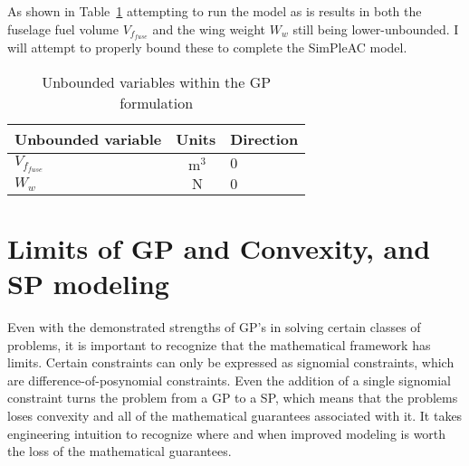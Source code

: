 
As shown in Table~\ref{t:WLTD_unbounded} attempting to run the model as is
results in both the fuselage fuel
volume $V_{f_{fuse}}$ and the wing weight $W_w$ still being lower-unbounded.
I will attempt to properly bound these to complete the SimPleAC model.

\begin{footnotesize}
    \begin{center}
        \begin{table}
            \begin{tabular}{ l c l }
                \toprule
                Unbounded variable & Units & Direction \\
                \midrule
                $V_{f_{fuse}}$ &  $~\mathrm{m^3}$  & $0$ \\
                $W_w$ & $~\mathrm{N}$  & $0$ \\
                \bottomrule
            \end{tabular}
            \caption{Unbounded variables within the GP formulation}
            \label{t:WLTD_unbounded}
        \end{table}
    \end{center}
\end{footnotesize}

\section{Limits of GP and Convexity, and SP modeling} \label{s:GPLimits}

Even with the demonstrated strengths of \gls{GP}'s in solving certain classes of 
problems, it is important to recognize that the mathematical framework has limits. 
Certain constraints can only be expressed as signomial constraints, which are 
difference-of-posynomial constraints. Even the addition of a single
signomial constraint turns the problem from a \gls{GP} to a \gls{SP}, which means
that the problems loses convexity and all of the mathematical guarantees associated with it. 
It takes engineering intuition to recognize where and when improved modeling is worth
the loss of the mathematical guarantees.

